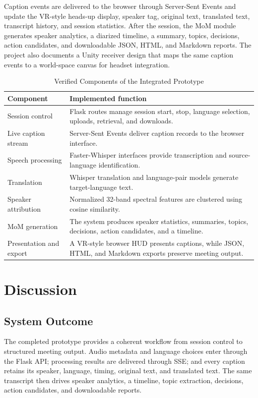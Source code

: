 \documentclass[conference]{IEEEtran}
\begin{document}
Caption events are delivered to the browser through Server-Sent Events and update the VR-style heads-up display, speaker tag, original text, translated text, transcript history, and session statistics. After the session, the MoM module generates speaker analytics, a diarized timeline, a summary, topics, decisions, action candidates, and downloadable JSON, HTML, and Markdown reports. The project also documents a Unity receiver design that maps the same caption events to a world-space canvas for headset integration.

\begin{table}[!t]
\caption{Verified Components of the Integrated Prototype}
\label{tab:components}
\centering
\scriptsize
\begin{tabular}{@{}p{}p{}@{}}
\toprule
Component & Implemented function \\
\midrule
Session control & Flask routes manage session start, stop, language selection, uploads, retrieval, and downloads. \\
Live caption stream & Server-Sent Events deliver caption records to the browser interface. \\
Speech processing & Faster-Whisper interfaces provide transcription and source-language identification. \\
Translation & Whisper translation and language-pair models generate target-language text. \\
Speaker attribution & Normalized 32-band spectral features are clustered using cosine similarity. \\
MoM generation & The system produces speaker statistics, summaries, topics, decisions, action candidates, and a timeline. \\
Presentation and export & A VR-style browser HUD presents captions, while JSON, HTML, and Markdown exports preserve meeting output. \\
\bottomrule
\end{tabular}
\end{table}

\clearpage

\section{Discussion}

\subsection{System Outcome}
The completed prototype provides a coherent workflow from session control to structured meeting output. Audio metadata and language choices enter through the Flask API; processing results are delivered through SSE; and every caption retains its speaker, language, timing, original text, and translated text. The same transcript then drives speaker analytics, a timeline, topic extraction, decisions, action candidates, and downloadable reports.
\end{document}
